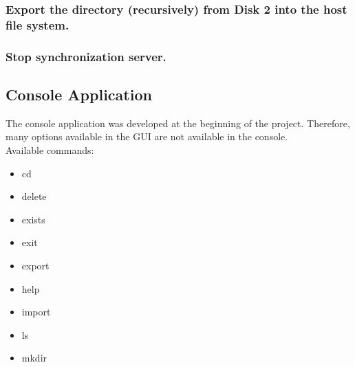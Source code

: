 \documentclass[JCDReport.tex]{subfiles}
\begin{document}
\subsubsection{Export the directory (recursively) from Disk 2 into the host file system.}

\subsubsection{Stop synchronization server.}





\subsection{Console Application}

The console application was developed at the beginning of the project. Therefore, many options available in the GUI are not available in the console.\\

Available commands:
\begin{itemize}
\item cd
\item delete
\item exists
\item exit
\item export
\item help
\item import
\item ls
\item mkdir
\end{itemize}
\end{document}
